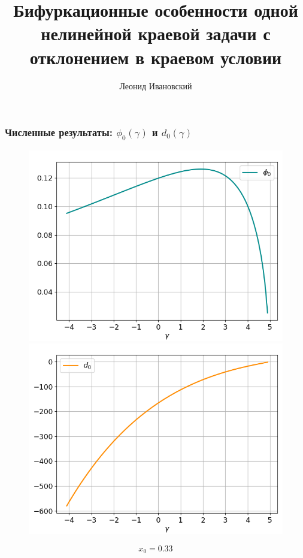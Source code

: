 \documentclass[fullscreen=true, unicode, bookmarks=false]{beamer}
\begin{document}
\begin{frame}
\frametitle{ Численные результаты: $ \phi_0(\gamma) $ и $ d_0(\gamma) $ }

\begin{figure} 
\includegraphics[scale=0.37]{oscillating_phi0_13.png}  
\hfill
\includegraphics[scale=0.37]{oscillating_d0_13.png}  
\end{figure}

$$ x_0 = 0.33 $$

\end{frame}

\title[]{ {\huge Бифуркационные особенности одной нелинейной краевой задачи с отклонением в краевом условии} }   
\author[]{{\Large Леонид Ивановский}} 
\date{ }

\begin{frame}
\titlepage
\end{frame} 
\end{document}
